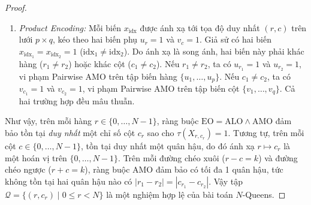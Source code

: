 \documentclass[a4paper,fleqn]{cas-sc}
\begin{document}
\begin{proof}
\begin{enumerate}
    \item \textit{Product Encoding:} Mỗi biến $x_{\text{idx}}$ được ánh xạ tới tọa độ duy nhất $(r, c)$ trên lưới $p \times q$, kéo theo hai biến phụ $u_r = 1$ và $v_c = 1$. Giả sử có hai biến $x_{\text{idx}_1} = x_{\text{idx}_2} = 1$ ($\text{idx}_1 \neq \text{idx}_2$). Do ánh xạ là song ánh, hai biến này phải khác hàng ($r_1 \neq r_2$) hoặc khác cột ($c_1 \neq c_2$). Nếu $r_1 \neq r_2$, ta có $u_{r_1} = 1$ và $u_{r_2} = 1$, vi phạm Pairwise AMO trên tập biến hàng $\{u_1, \dots, u_p\}$. Nếu $c_1 \neq c_2$, ta có $v_{c_1} = 1$ và $v_{c_2} = 1$, vi phạm Pairwise AMO trên tập biến cột $\{v_1, \dots, v_q\}$. Cả hai trường hợp đều mâu thuẫn.
\end{enumerate}
Như vậy, trên mỗi hàng $r \in \{0, \dots, N-1\}$, ràng buộc $\text{EO} = \text{ALO} \land \text{AMO}$ đảm bảo tồn tại \textit{duy nhất} một chỉ số cột $c_r$ sao cho $\tau(X_{r, c_r}) = 1$. Tương tự, trên mỗi cột $c \in \{0, \dots, N-1\}$, tồn tại duy nhất một quân hậu, do đó ánh xạ $r \mapsto c_r$ là một hoán vị trên $\{0, \dots, N-1\}$. Trên mỗi đường chéo xuôi ($r - c = k$) và đường chéo ngược ($r + c = k$), ràng buộc AMO đảm bảo có tối đa 1 quân hậu, tức không tồn tại hai quân hậu nào có $|r_1 - r_2| = |c_{r_1} - c_{r_2}|$. Vậy tập $\mathcal{Q} = \{(r, c_r) \mid 0 \le r < N\}$ là một nghiệm hợp lệ của bài toán $N$-Queens.


\end{proof}
\end{document}
